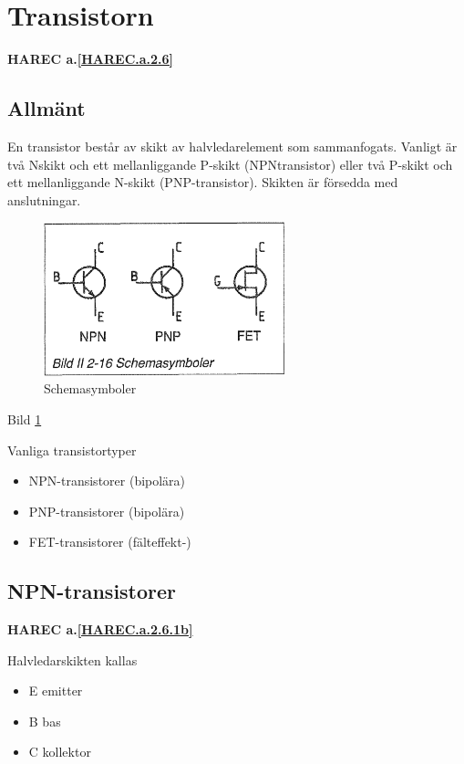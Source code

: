 \section{Transistorn}
\textbf{HAREC a.\ref{HAREC.a.2.6}\label{myHAREC.a.2.6}}
\label{transistorn}

\subsection{Allmänt}

En transistor består av skikt av halvledarelement som sammanfogats. Vanligt är
två Nskikt och ett mellanliggande P-skikt (NPNtransistor) eller två P-skikt och
ett mellanliggande N-skikt (PNP-transistor). Skikten är försedda med
anslutningar.

\begin{figure}[h]
\begin{center}
\includegraphics[width=7cm]{images/bild_2_2-16}
\caption{Schemasymboler}
\label{fig:BildII2-16}
\end{center}
\end{figure}

Bild \ref{fig:BildII2-16}

Vanliga transistortyper
\begin{itemize}
\item NPN-transistorer (bipolära)
\item PNP-transistorer (bipolära)
\item FET-transistorer (fälteffekt-)
\end{itemize}

\subsection{NPN-transistorer}
\textbf{HAREC a.\ref{HAREC.a.2.6.1b}\label{myHAREC.a.2.6.1b}}

Halvledarskikten kallas
\begin{itemize}
\item E emitter
\item B bas
\item C kollektor
\end{itemize}

